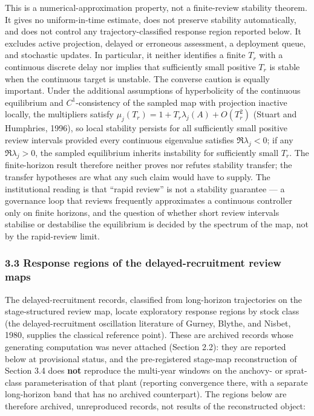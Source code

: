 \documentclass[11pt]{article}
\begin{document}
This is a numerical-approximation property, not a finite-review
stability theorem. It gives no uniform-in-time estimate, does not
preserve stability automatically, and does not control any
trajectory-classified response region reported below. It excludes active
projection, delayed or erroneous assessment, a deployment queue, and
stochastic updates. In particular, it neither identifies a finite
\(T_r\) with a continuous discrete delay nor implies that sufficiently
small positive \(T_r\) is stable when the continuous target is unstable.
The converse caution is equally important. Under the additional
assumptions of hyperbolicity of the continuous equilibrium and
\(C^1\)-consistency of the sampled map with projection inactive locally,
the multipliers satisfy \(\mu_j(T_r) = 1 + T_r\lambda_j(A) + O(T_r^2)\)
(Stuart and Humphries, 1996), so local stability persists for all sufficiently small positive review intervals provided every continuous eigenvalue satisfies \(\Re\lambda_j<0\); if any \(\Re\lambda_j>0\), the sampled equilibrium inherits instability for sufficiently small \(T_r\). The finite-horizon result therefore neither proves nor
refutes stability transfer; the transfer hypotheses are what any such
claim would have to supply. The institutional reading is that ``rapid
review'' is not a stability guarantee --- a governance loop that reviews
frequently approximates a continuous controller only on finite horizons,
and the question of whether short review intervals stabilise or
destabilise the equilibrium is decided by the spectrum of the map, not
by the rapid-review limit.

\subsubsection{3.3 Response regions of the delayed-recruitment review
maps}\label{response-regions-of-the-delayed-recruitment-review-maps}

The delayed-recruitment records, classified from long-horizon
trajectories on the stage-structured review map, locate exploratory
response regions by stock class (the delayed-recruitment oscillation
literature of Gurney, Blythe, and Nisbet, 1980, supplies the classical
reference point). These are archived records whose generating
computation was never attached (Section 2.2): they are reported below at
provisional status, and the
pre-registered stage-map reconstruction of Section 3.4 does \textbf{not}
reproduce the multi-year windows on the anchovy- or sprat-class
parameterisation of that plant (reporting convergence there, with a
separate long-horizon band that has no archived counterpart). The
regions below are therefore archived, unreproduced records, not results
of the reconstructed object:
\end{document}
